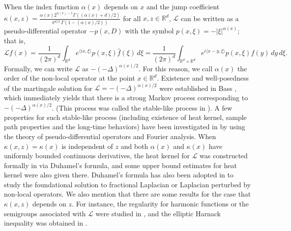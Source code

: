 \documentclass[a4paper,11pt]{amsart}
\newcommand{\R}{\mathds R}
\newcommand{\K}{\kappa}
\newcommand{\A}{\alpha}
\def\LL{{\mathcal L}}
\def\wh{\widehat}
\theoremstyle{definition}
\begin{document}
When the index function $\A(x)$ depends on $x $ and the jump
coefficient $\kappa(x,z)=\frac{\alpha(x)2^{\alpha(x)-1}\Gamma
((\alpha(x)+d)/2)}{\pi^{d/2}\,\Gamma(1-(\alpha(x)/2))}$ for all
$x,z\in \R^d$, $\LL$ can be written as a pseudo-differential operator
$-p(x,D)$ with the symbol $p(x, \xi)= -|\xi|^{\alpha(x)}$; that is,
$$
\LL f(x) = \frac{1}{(2\pi)^d} \int_{\R^d} e^{\langle ix, \xi\rangle} p(x, \xi) \wh  f(\xi)\, d\xi
= \frac{1}{(2\pi)^d} \int_{\R^d\times \R^d} e^{i \langle x-y, \xi\rangle} p(x, \xi) f(y) \,dy \,d\xi .
$$
Formally, we can write $\LL$ as $-(-\Delta)^{\alpha (x)/2}$.
For this reason, we call $\alpha(x)$ the order of the non-local operator at the point $x\in \R^d$.
Existence and well-posedness of
the martingale solution for $\LL= -(-\Delta)^{\alpha (x)/2}$ were established in Bass \cite{Bass1}, which
immediately yields that there is  a strong Markov process corresponding to $-(-\Delta)^{\alpha (x)/2}$.
(This process was called the stable-like process in \cite{Bass1}). A few
properties for such stable-like process (including existence of heat
kernel, sample path properties and the long-time behaviors) have
been investigated in \cite{BSW,Hoh,KN,Neg,NS, Sch} by using the theory of
pseudo-differential operators and Fourier analysis. When $\kappa (x,
z)=\kappa (x)$ is independent of $z$ and both $\alpha (x)$ and
$\kappa (x)$ have uniformly bounded continuous derivatives, the heat
kernel for $\LL$ was constructed formally in \cite[Section 5]{Kol} via
 Duhamel's formula, and some upper bound estimates for heat kernel were
also given there. Duhamel's formula has also been adopted in
\cite{CW,W} to study the foundational solution to fractional
Laplacian or Laplacian perturbed by non-local operators. We also
mention that there are some results for the case that $\K(x,z)$
depends on $z$. For instance, the regularity for harmonic functions
or the semigroups associated with $\LL$ were studied in
\cite{BK1,LW,S1}, and the elliptic Harnack inequality was obtained
in \cite{BK2}.
\end{document}
